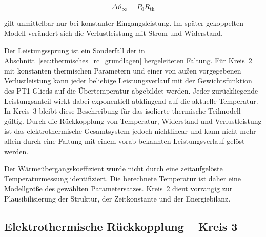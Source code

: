 \begin{equation}
    \Delta\vartheta_\infty
    =
    P_0R_\mathrm{th}
    \label{eq:kap5_thermischer_endwert}
\end{equation}

gilt unmittelbar nur bei konstanter Eingangsleistung. Im später gekoppelten
Modell verändert sich die Verlustleistung mit Strom und Widerstand.

Der Leistungssprung ist ein Sonderfall der in
Abschnitt~\ref{sec:thermisches_rc_grundlagen} hergeleiteten Faltung. Für
Kreis~2 mit konstanten thermischen Parametern und einer von außen
vorgegebenen Verlustleistung kann jeder beliebige Leistungsverlauf mit der
Gewichtsfunktion des PT1-Glieds auf die Übertemperatur abgebildet werden.
Jeder zurückliegende Leistungsanteil wirkt dabei exponentiell abklingend auf
die aktuelle Temperatur. In Kreis~3 bleibt diese Beschreibung für das
isolierte thermische Teilmodell gültig. Durch die Rückkopplung von
Temperatur, Widerstand und Verlustleistung ist das elektrothermische
Gesamtsystem jedoch nichtlinear und kann nicht mehr allein durch eine Faltung
mit einem vorab bekannten Leistungsverlauf gelöst werden.


Der Wärmeübergangskoeffizient wurde nicht durch eine zeitaufgelöste
Temperaturmessung identifiziert. Die berechnete Temperatur ist daher eine
Modellgröße des gewählten Parametersatzes. Kreis~2 dient vorrangig zur
Plausibilisierung der Struktur, der Zeitkonstante und der Energiebilanz.



\subsection{Elektrothermische Rückkopplung -- Kreis 3}
\label{sec:thermisches_modell_kreis3}


